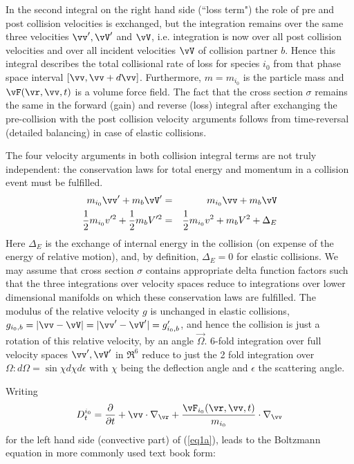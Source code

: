 In the second integral on the right hand side (``loss term") the role of pre and post collision velocities is exchanged, but the integration
remains over the same three velocities $\vv',\vV'$ and $\vV$, i.e. integration is now over all post collision velocities and
over all incident velocities $\vV$ of collision partner $b$. Hence this
integral describes the total collisional rate of loss for species $i_0$ from that phase space interval $[\vv,\vv+d\vv]$.
Furthermore, $m = m_{i_0}$ is the particle mass and
$\vF(\vr,\vv,t)$ is a volume force
field. The fact that the cross section $\sigma$ remains the same in the forward (gain) and reverse (loss) integral
after exchanging the pre-collision with the post collision velocity arguments
follows from time-reversal (detailed balancing) in case of elastic collisions.


The four velocity arguments in both collision integral terms are not truly independent:
the conservation laws for total energy and
momentum in a collision event must be fulfilled.
\begin{eqnarray}\label{massenergy}
m_{i_0} \vv' + m_b\vV' &=& m_{i_0}\vv + m_b \vV \nonumber\\
\frac12 m_{i_0}v'^2+\frac12m_bV'^2&=&\frac12 m_{i_0}v^2 + m_b V^2 +\Delta_E
\end{eqnarray}
Here $\Delta_E$ is the exchange of internal energy in the collision (on expense of the energy of relative motion), and, by definition, $\Delta_E = 0$ for elastic collisions.
We may assume that cross section $\sigma$ contains appropriate delta function factors such that the three
integrations over velocity spaces reduce to integrations over lower dimensional manifolds on which these conservation laws are fulfilled.
The modulus of the relative velocity $g$ is unchanged in elastic collisions,
$g_{i_0,b} = |\vv-\vV| = |\vv'-\vV'| = g_{i_0,b}'$,
and hence the collision is just a rotation of this relative velocity, by an angle $\vec\Omega$. 6-fold integration over full velocity spaces $\vv', \vV'$
in $\Re^6$ reduce to just the 2 fold integration
over $\Omega:  d\Omega=\sin\chi d\chi d\epsilon$ with $\chi$ being the deflection angle
and $\epsilon$ the scattering angle.


Writing
\begin{equation} \nonumber
D_t^{i_0} = \frac\partial{\partial t} + \vv \cdot
\nabla_{\vr} + \frac{\vF_{i_0}(\vr,\vv,t)}{m_{i_0}} \cdot
\nabla_{\vv}
\end{equation}
for the left hand side (convective part) of (\ref{eq1a}), leads to the Boltzmann equation in more commonly used text book form:

